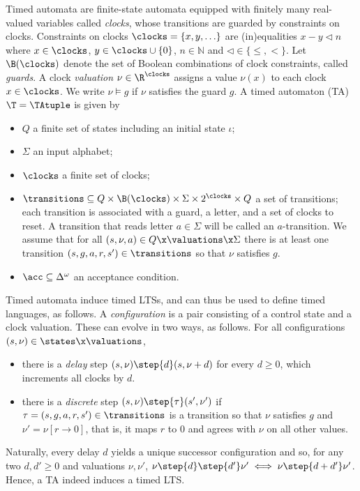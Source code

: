 \medskip
{}
Timed automata are finite-state automata equipped with
finitely many real-valued variables called \emph{clocks}, whose transitions are guarded by constraints on clocks.
Constraints on clocks $\clocks=\{x,y,\ldots\}$ are (in)equalities $x-y \triangleleft n$ where $x\in \clocks$, $y\in \clocks\cup \{0\}$, $n\in \mathbb{N}$ and $\triangleleft \in \{\leq, <\}$. Let $\B(\clocks)$ denote the set of Boolean combinations of clock constraints, called \emph{guards}.
A clock \emph{valuation} $\nu\in \R^\clocks$ assigns a value $\nu(x)$ to each clock $x\in \clocks$. We write $\nu \models g$ if $\nu$ satisfies the guard $g$. 
A timed automaton (TA) $\T=\TAtuple$ is given by 
\begin{itemize}
\item $Q$ a finite set of states including an initial state $\iota$;
\item $\Sigma$ an input alphabet;
\item $\clocks$ a finite set of clocks;
\item $\transitions\subseteq Q\times \B(\clocks)\times \Sigma\times 2^\clocks \times Q$  a set of transitions; each transition is associated with a guard, a letter, and a set of clocks to reset. 
    A transition that reads letter $a\in\Sigma$ will be called an $a$-transition.
    We assume that %
    for all $(s,\nu,a)\in Q\x\valuations\x\Sigma$ there is at least one
    transition $(s,g,a,r,s')\in\transitions$
    so that $\nu$ satisfies $g$.
\item $\acc\subseteq \Delta^\omega$ an acceptance condition. 
\end{itemize}
Timed automata induce timed LTSs, and can thus be used to define timed languages, as follows.
A \emph{configuration} is a pair consisting of
a control state and a clock valuation.
These can evolve in two ways, as follows.
For all configurations $(s,\nu)\in \states\x\valuations$,
\begin{itemize}
    \item 
        there is a \emph{delay} step 
        $(s,\nu)\step{d}(s,\nu+d)$
        for every $d\ge0$, which increments all clocks by $d$.
    \item there is a \emph{discrete} step
        $(s,\nu)\step{\tau}(s',\nu')$ 
        if
        $\tau=(s,g,a,r,s')\in\transitions$
        is a transition so that $\nu$ satisfies $g$ and $\nu'=\nu[r\rightarrow 0]$, that is, it maps $r$ to $0$ and agrees with $\nu$ on all other values.
\end{itemize}
Naturally, every delay $d$ yields a unique successor configuration
and so, for any two $d,d'\ge 0$ and valuations $\nu,\nu'$,
$\nu\step{d}\step{d'}\nu'\iff\nu\step{d+d'}\nu'$.
Hence, a TA indeed induces a timed LTS.

